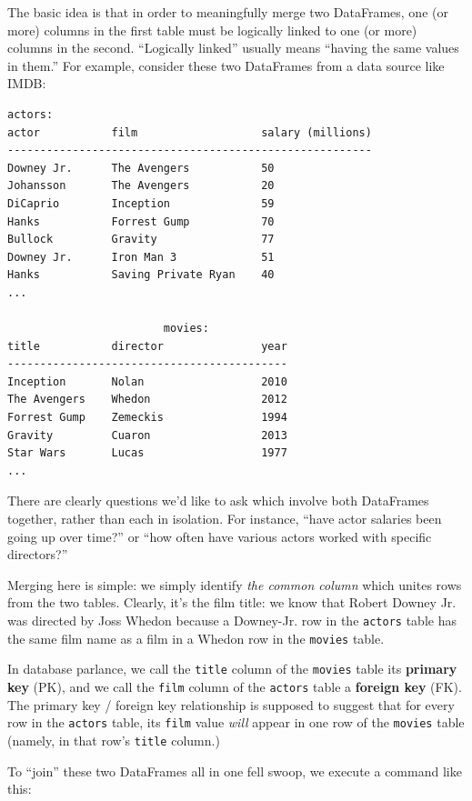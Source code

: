 \documentclass[12pt]{article}
\begin{document}
The basic idea is that in order to meaningfully merge two DataFrames, one (or
more) columns in the first table must be logically linked to one (or more)
columns in the second. ``Logically linked'' usually means ``having the same
values in them.'' For example, consider these two DataFrames from a data source
like IMDB:

\pagebreak
\begin{Verbatim}[fontsize=\small,samepage=true,frame=none]
                        actors:
actor           film                   salary (millions)
--------------------------------------------------------
Downey Jr.      The Avengers           50
Johansson       The Avengers           20
DiCaprio        Inception              59
Hanks           Forrest Gump           70
Bullock         Gravity                77
Downey Jr.      Iron Man 3             51
Hanks           Saving Private Ryan    40
...

                        movies:
title           director               year
-------------------------------------------
Inception       Nolan                  2010
The Avengers    Whedon                 2012
Forrest Gump    Zemeckis               1994
Gravity         Cuaron                 2013
Star Wars       Lucas                  1977
...
\end{Verbatim}
\normalsize
 
There are clearly questions we'd like to ask which involve both DataFrames
together, rather than each in isolation. For instance, ``have actor salaries
been going up over time?'' or ``how often have various actors worked with
specific directors?''

Merging here is simple: we simply identify \textit{the common column} which
unites rows from the two tables. Clearly, it's the film title: we know that
Robert Downey Jr. was directed by Joss Whedon because a Downey-Jr. row in the
\texttt{actors} table has the same film name as a film in a Whedon row in the
\texttt{movies} table.

In database parlance, we call the \texttt{title} column of the \texttt{movies}
table its \textbf{primary key} (PK), and we call the \texttt{film} column of
the \texttt{actors} table a \textbf{foreign key} (FK). The primary key /
foreign key relationship is supposed to suggest that for every row in the
\texttt{actors} table, its \texttt{film} value \textit{will} appear in one row
of the \texttt{movies} table (namely, in that row's \texttt{title} column.)

To ``join'' these two DataFrames all in one fell swoop, we execute a command
like this:
\end{document}
